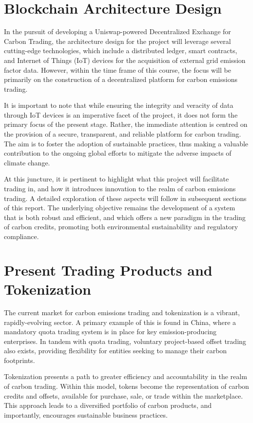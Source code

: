 \documentclass[sigconf, authordraft]{acmart}
\begin{document}
	\section{Blockchain Architecture Design}


	In the pursuit of developing a Uniswap-powered Decentralized Exchange for Carbon
	Trading, the architecture design for the project will leverage several cutting-edge
	technologies, which include a distributed ledger, smart contracts, and Internet
	of Things (IoT) devices for the acquisition of external grid emission factor data.
	However, within the time frame of this course, the focus will be primarily on
	the construction of a decentralized platform for carbon emissions trading.

	It is important to note that while ensuring the integrity and veracity of data
	through IoT devices is an imperative facet of the project, it does not form the
	primary focus of the present stage. Rather, the immediate attention is centred
	on the provision of a secure, transparent, and reliable platform for carbon trading.
	The aim is to foster the adoption of sustainable practices, thus making a valuable
	contribution to the ongoing global efforts to mitigate the adverse impacts of climate
	change.

	At this juncture, it is pertinent to highlight what this project will
	facilitate trading in, and how it introduces innovation to the realm of carbon
	emissions trading. A detailed exploration of these aspects will follow in
	subsequent sections of this report. The underlying objective remains the development
	of a system that is both robust and efficient, and which offers a new paradigm
	in the trading of carbon credits, promoting both environmental sustainability and
	regulatory compliance.

	\section{Present Trading Products and Tokenization}


	The current market for carbon emissions trading and tokenization is a vibrant,
	rapidly-evolving sector. A primary example of this is found in China, where a
	mandatory quota trading system is in place for key emission-producing
	enterprises. In tandem with quota trading, voluntary project-based offset
	trading also exists, providing flexibility for entities seeking to manage their
	carbon footprints.

	Tokenization presents a path to greater efficiency and accountability in the realm
	of carbon trading. Within this model, tokens become the representation of carbon
	credits and offsets, available for purchase, sale, or trade within the
	marketplace. This approach leads to a diversified portfolio of carbon products,
	and importantly, encourages sustainable business practices.
\end{document}
